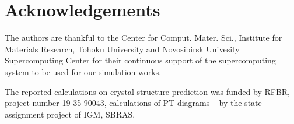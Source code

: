 \documentclass[twoside,twocolumn,9pt]{article}
\begin{document}

\section*{Acknowledgements}

The authors are thankful to the Center for Comput. Mater. Sci., Institute for Materials Research, Tohoku University and Novosibirsk Univesity Supercomputing Center for their continuous support of the supercomputing system to be used for our simulation works. 

The reported calculations on crystal structure prediction was funded by RFBR, project number 19-35-90043, calculations of PT diagrams – by the state assignment project of IGM, SBRAS.

\balance
\end{document}
